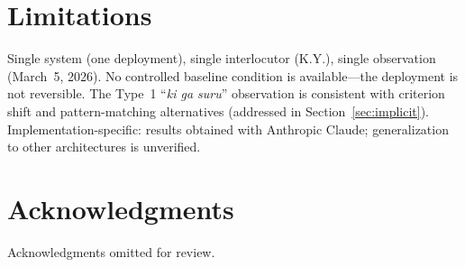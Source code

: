\documentclass[11pt]{article}
\begin{document}
\section*{Limitations}

Single system (one deployment), single interlocutor (K.Y.), single
observation (March~5, 2026). No controlled baseline condition is
available---the deployment is not reversible. The Type~1 ``\textit{ki
ga suru}'' observation is consistent with criterion shift and
pattern-matching alternatives (addressed in Section~\ref{sec:implicit}).
Implementation-specific: results obtained with Anthropic Claude;
generalization to other architectures is unverified.


\section*{Acknowledgments}

Acknowledgments omitted for review.




\end{document}
